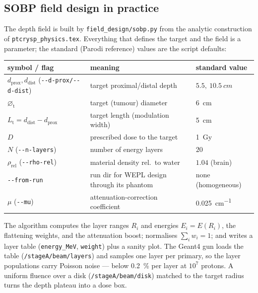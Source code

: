 \documentclass[11pt]{article}
\newcommand{\file}[1]{\texttt{#1}}
\begin{document}
\subsection{SOBP field design in practice}
\label{sec:field}
The depth field is built by \file{field\_design/sobp.py} from the analytic
construction of \file{ptcrysp\_physics.tex}. Everything that defines the target and
the field is a parameter; the standard (Parodi reference) values are the script
defaults:
\begin{center}
\begin{tabular}{lll}
\toprule
symbol / flag & meaning & standard value \\
\midrule
$d_{\mathrm{prox}},d_{\mathrm{dist}}$ (\file{-{}-d-prox/-{}-d-dist}) & target proximal/distal depth & $5.5,\ \SI{10.5}{cm}$ \\
$\varnothing_{\mathrm t}$ & target (tumour) diameter & \SI{6}{cm} \\
$L_{\mathrm t}=d_{\mathrm{dist}}-d_{\mathrm{prox}}$ & target length (modulation width) & \SI{5}{cm} \\
$D$ & prescribed dose to the target & \SI{1}{Gy} \\
$N$ (\file{-{}-n-layers}) & number of energy layers & $20$ \\
$\rho_{\mathrm{rel}}$ (\file{-{}-rho-rel}) & material density rel.\ to water & $1.04$ (brain) \\
\file{-{}-from-run} & run dir for WEPL design through its phantom & none (homogeneous) \\
$\mu$ (\file{-{}-mu}) & attenuation-correction coefficient & \SI{0.025}{cm^{-1}} \\
\bottomrule
\end{tabular}
\end{center}

The algorithm computes the layer ranges $R_i$ and energies $E_i=E(R_i)$, the
flattening weights, and the attenuation boost; normalises $\sum_i w_i=1$; and
writes a layer table (\file{energy\_MeV}, \file{weight}) plus a sanity plot. The
Geant4 gun loads the table (\file{/stageA/beam/layers}) and samples one layer per
primary, so the layer populations carry Poisson noise --- below
\SI{0.2}{\percent} per layer at $10^{7}$ protons. A uniform fluence over a disk (\file{/stageA/beam/disk}) matched to the
target radius turns the depth plateau into a dose box.
\end{document}
